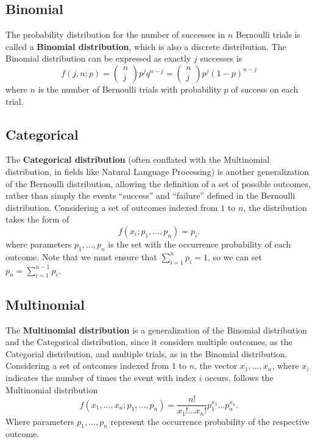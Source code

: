 \subsection{\label{binomial} Binomial}
The probability distribution for the number of successes in $n$ Bernoulli trials is called a {\bf Binomial distribution}, which is also a discrete distribution. The Binomial distribution can be expressed as 
exactly $j$ successes is 
\begin{equation*}
f(j,n;p)= \left(\begin{array}{c}
n \\
j \end{array}\right) p^{j}q^{n-j} = \left(\begin{array}{c}
n \\
j \end{array}\right) p^{j}(1-p)^{n-j}
\end{equation*}
where $n$ is the number of Bernoulli trials with probability $p$ of success on each trial.

\subsection{\label{categorical} Categorical}
The \textbf{Categorical distribution} (often conflated with the Multinomial distribution, in fields like Natural Language Processing) is another generalization of the Bernoulli distribution, allowing the definition of a set of possible outcomes, rather than simply the events ``success'' and ``failure'' defined in the Bernoulli distribution. Considering a set of outcomes indexed from $1$ to $n$, the distribution takes the form of
\begin{equation*}
f(x_i;p_1,...,p_n) = p_i.
\end{equation*}
where parameters $p_1,...,p_n$ is the set with the occurrence probability of each outcome. Note that we must ensure that $\sum_{i=1}^np_i=1$, so we can set $p_n = \sum_{i=1}^{n-1}p_i$.

\subsection{\label{multinomial} Multinomial}

The \textbf{Multinomial distribution} is a generalization of the Binomial distribution and the Categorical distribution, since it considers multiple outcomes, as the Categorial distribution, and multiple trials, as in the Binomial distribution.
Considering a set of outcomes indexed from $1$ to $n$, the vector $x_1,...,x_n$, where $x_i$ indicates the number of times the event with index $i$ occurs, follows the Multinomial distribution
\begin{equation*}
f(x_1,...,x_n;p_1,...,p_n) = \frac{n!}{x_{1}!...x_{n}!} p_{1}^{x_{1}}...p_{n}^{x_{n}}.
\end{equation*}
Where parameters $p_1,...,p_n$ represent the occurrence probability of the respective outcome.



